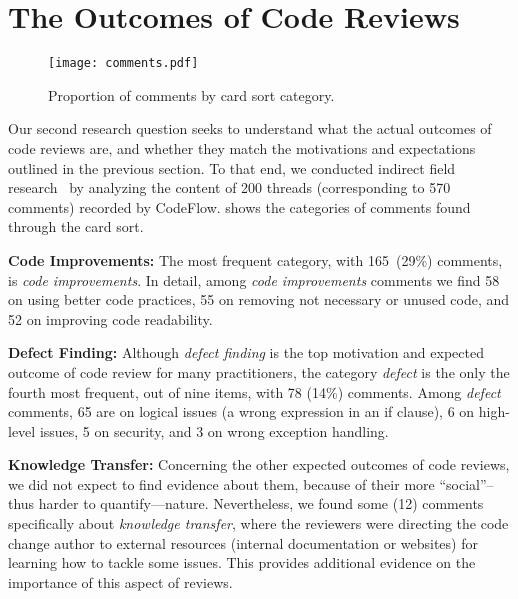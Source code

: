 
\section{The Outcomes of Code Reviews} \label{sec:outcomes}

\begin{figure}[t] %
   \centering
   \texttt{[image: comments.pdf]}
   \vspace{-1.5em}
   \caption{Proportion of comments by card sort category.}
   \label{fig:comments}
   \vspace{-1.5em}
\end{figure}

Our second research question seeks to understand what the actual outcomes of code reviews are, and whether they match the motivations and expectations outlined in the previous section. To that end, we conducted indirect field research~\cite{lethbridge2005studying} by analyzing the content of 200 threads (corresponding to 570 comments) recorded by CodeFlow.  shows the categories of comments found through the card sort.

\textbf{Code Improvements:} The most frequent category, with 165~(29\%) comments, is \emph{code improvements}. In detail, among \emph{code improvements} comments we find 58 on using better code practices, 55 on removing not necessary or unused code, and 52 on improving code readability.

\textbf{Defect Finding:} Although \emph{defect finding} is the top motivation and expected outcome of code review for many practitioners, the category \emph{defect} is the only the fourth most frequent, out of nine items, with 78 (14\%) comments. Among \emph{defect} comments, 65 are on logical issues (\eg a wrong expression in an if clause), 6 on high-level issues, 5 on security, and 3 on wrong exception handling.

\textbf{Knowledge Transfer:} Concerning the other expected outcomes of code reviews, we did not expect to find evidence about them, because of their more ``social''--thus harder to quantify—nature. Nevertheless, we found some (12) comments specifically about \emph{knowledge transfer}, where the reviewers were directing the code change author to external resources (\eg internal documentation or websites) for learning how to tackle some issues. This provides additional evidence on the importance of this aspect of reviews.

